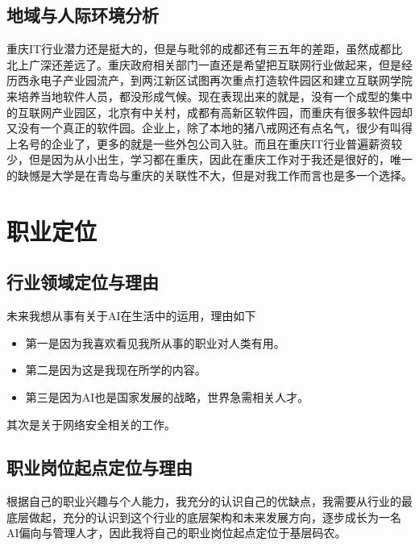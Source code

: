 \documentclass{article}
\begin{document}
\subsection{地域与人际环境分析}
重庆IT行业潜力还是挺大的，但是与毗邻的成都还有三五年的差距，虽然成都比北上广深还差远了。重庆政府相关部门一直还是希望把互联网行业做起来，但是经历西永电子产业园流产，到两江新区试图再次重点打造软件园区和建立互联网学院来培养当地软件人员，都没形成气候。现在表现出来的就是，没有一个成型的集中的互联网产业园区，北京有中关村，成都有高新区软件园，而重庆有很多软件园却又没有一个真正的软件园。企业上，除了本地的猪八戒网还有点名气，很少有叫得上名号的企业了，更多的就是一些外包公司入驻。而且在重庆IT行业普遍薪资较少，但是因为从小出生，学习都在重庆，因此在重庆工作对于我还是很好的，唯一的缺憾是大学是在青岛与重庆的关联性不大，但是对我工作而言也是多一个选择。 \par
\par 




\section{职业定位}


\subsection{行业领域定位与理由}
未来我想从事有关于AI在生活中的运用，理由如下\par
\begin{itemize}
    \item 第一是因为我喜欢看见我所从事的职业对人类有用。
    \item 第二是因为这是我现在所学的内容。
    \item 第三是因为AI也是国家发展的战略，世界急需相关人才。\par
\end{itemize}
其次是关于网络安全相关的工作。\par
\subsection{职业岗位起点定位与理由}
根据自己的职业兴趣与个人能力，我充分的认识自己的优缺点，我需要从行业的最底层做起，充分的认识到这个行业的底层架构和未来发展方向，逐步成长为一名AI偏向与管理人才，因此我将自己的职业岗位起点定位于基层码农。\par
\end{document}
